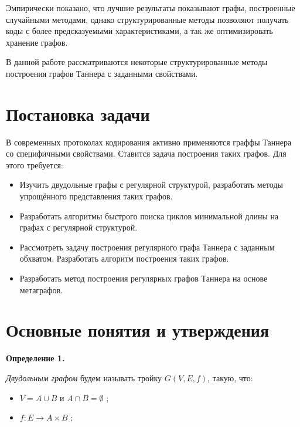 \documentclass[14pt]{mmcs-article}
\begin{document}
Эмпирически показано, что лучшие результаты показывают графы, построенные случайными методами, однако структурированные методы позволяют получать коды с более предсказуемыми характеристиками, а так же оптимизировать хранение графов. 

В данной работе рассматриваются некоторые структурированные методы построения графов Таннера с заданными свойствами.

\newpage
{}

\section*{Постановка задачи}

В современных протоколах кодирования активно применяются граффы Таннера со специфичными свойствами. Ставится задача построения таких графов. Для этого требуется:

\begin{itemize}
  \item Изучить двудольные графы с регулярной структурой, разработать методы упрощённого представления таких графов.
  \item Разработать алгоритмы быстрого поиска циклов минимальной длины на графах с регулярной структурой.
  \item Рассмотреть задачу построения регулярного графа Таннера с заданным обхватом. Разработать алгоритм построения таких графов.
  \item Разработать метод построения регулярных графов Таннера на основе метаграфов.
\end{itemize}

\newpage
\section{Основные понятия и утверждения}

\textbf{Определение 1.}


\textsl{Двудольным графом} будем называть тройку $ G(V, E, f)$, такую, что:

\begin{itemize}
    \item $V = A \cup B$ и $A \cap B = \emptyset$ ;
    \item $f: E \rightarrow A \times B$ ;
\end{itemize}
\end{document}
